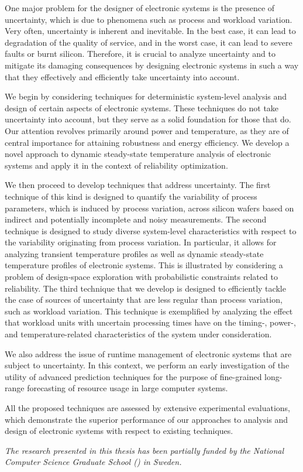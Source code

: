One major problem for the designer of electronic systems is the presence of
uncertainty, which is due to phenomena such as process and workload variation.
Very often, uncertainty is inherent and inevitable. In the best case, it can
lead to degradation of the quality of service, and in the worst case, it can
lead to severe faults or burnt silicon. Therefore, it is crucial to analyze
uncertainty and to mitigate its damaging consequences by designing electronic
systems in such a way that they effectively and efficiently take uncertainty
into account.

We begin by considering techniques for deterministic system-level analysis and
design of certain aspects of electronic systems. These techniques do not take
uncertainty into account, but they serve as a solid foundation for those that
do. Our attention revolves primarily around power and temperature, as they are
of central importance for attaining robustness and energy efficiency. We develop
a novel approach to dynamic steady-state temperature analysis of electronic
systems and apply it in the context of reliability optimization.

We then proceed to develop techniques that address uncertainty. The first
technique of this kind is designed to quantify the variability of process
parameters, which is induced by process variation, across silicon wafers based
on indirect and potentially incomplete and noisy measurements. The second
technique is designed to study diverse system-level characteristics with respect
to the variability originating from process variation. In particular, it allows
for analyzing transient temperature profiles as well as dynamic steady-state
temperature profiles of electronic systems. This is illustrated by considering a
problem of design-space exploration with probabilistic constraints related to
reliability. The third technique that we develop is designed to efficiently
tackle the case of sources of uncertainty that are less regular than process
variation, such as workload variation. This technique is exemplified by
analyzing the effect that workload units with uncertain processing times have on
the timing-, power-, and temperature-related characteristics of the system under
consideration.

We also address the issue of runtime management of electronic systems that are
subject to uncertainty. In this context, we perform an early investigation of
the utility of advanced prediction techniques for the purpose of fine-grained
long-range forecasting of resource usage in large computer systems.

All the proposed techniques are assessed by extensive experimental evaluations,
which demonstrate the superior performance of our approaches to analysis and
design of electronic systems with respect to existing techniques.

\vspace{1em}
\noindent
\emph{
  The research presented in this thesis has been partially funded by the
  National Computer Science Graduate School () in Sweden.
}
